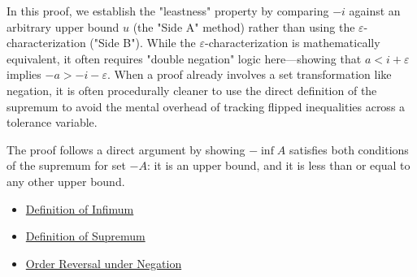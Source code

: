 \begin{remark*}
In this proof, we establish the "leastness" property by comparing $-i$ against an arbitrary upper bound $u$ (the "Side A" method) rather than using the $\varepsilon$-characterization ("Side B"). While the $\varepsilon$-characterization is mathematically equivalent, it often requires "double negation" logic here---showing that $a < i + \varepsilon$ implies $-a > -i - \varepsilon$. When a proof already involves a set transformation like negation, it is often procedurally cleaner to use the direct definition of the supremum to avoid the mental overhead of tracking flipped inequalities across a tolerance variable.
\end{remark*}

\begin{remark*}
The proof follows a direct argument by showing $- \inf A$ satisfies both conditions of the supremum for set $-A$: it is an upper bound, and it is less than or equal to any other upper bound.
\end{remark*}

\begin{dependencies}
\begin{itemize}
  \item \hyperref[def:infimum]{Definition of Infimum}
  \item \hyperref[def:supremum]{Definition of Supremum}
  \item \hyperref[thm:ordered-field-negative-multiplication-reverses-order]{Order Reversal under Negation}
\end{itemize}
\end{dependencies}

\clearpage
